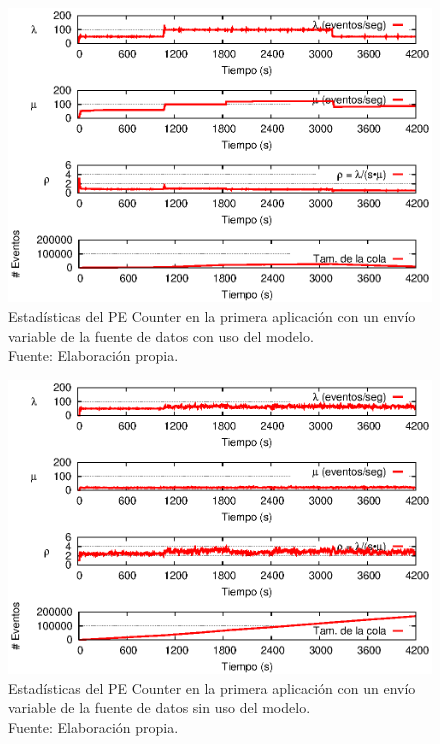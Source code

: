 \begin{figure}[!ht]
    \centering
    \captionsetup{justification=centering}
    \includegraphics[scale=1]{images/exp/app1/normal/cm/statusCounterPE.eps}
    \caption[Estad\'isticas del PE Counter en la primera aplicaci\'on con un env\'io variable de la fuente de datos con uso del modelo.]{Estad\'isticas del PE Counter en la primera aplicaci\'on con un env\'io variable de la fuente de datos con uso del modelo.\\Fuente: Elaboraci\'on propia.}
    \label{fig:app1-normal-statusCounterPE-cm}
\end{figure}

\begin{figure}[!ht]
    \centering
    \captionsetup{justification=centering}
    \includegraphics[scale=1]{images/exp/app1/normal/sm/statusCounterPE.eps}
    \caption[Estad\'isticas del PE Counter en la primera aplicaci\'on con un env\'io variable de la fuente de datos sin uso del modelo.]{Estad\'isticas del PE Counter en la primera aplicaci\'on con un env\'io variable de la fuente de datos sin uso del modelo.\\Fuente: Elaboraci\'on propia.}
    \label{fig:app1-normal-statusCounterPE-sm}
\end{figure}

